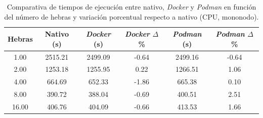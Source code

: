 \begin{table}[ht]
    \centering
    \begin{tabular}{|c|c|c|c|c|c|}
        \hline
        \textbf{Hebras} & \textbf{Nativo (s)} & \textbf{\textit{Docker} (s)} & \textbf{\textit{Docker} $\Delta$\%} & \textbf{\textit{Podman} (s)} & \textbf{\textit{Podman} $\Delta$\%} \\
        \hline
        1.00            & 2515.21             & 2499.09                      & -0.64                               & 2499.16                      & -0.64                               \\
        2.00            & 1253.18             & 1255.95                      & 0.22                                & 1266.51                      & 1.06                                \\
        4.00            & 664.69              & 652.33                       & -1.86                               & 665.38                       & 0.10                                \\
        8.00            & 390.72              & 388.04                       & -0.69                               & 400.51                       & 2.51                                \\
        16.00           & 406.76              & 404.09                       & -0.66                               & 413.53                       & 1.66                                \\
        \hline
    \end{tabular}
    \caption{Comparativa de tiempos de ejecución entre nativo, \textit{Docker} y \textit{Podman} en función del número de hebras y variación porcentual respecto a nativo (CPU, mononodo).}
    \label{tab:single-node_ubuntu_container_vs_native}
\end{table}

